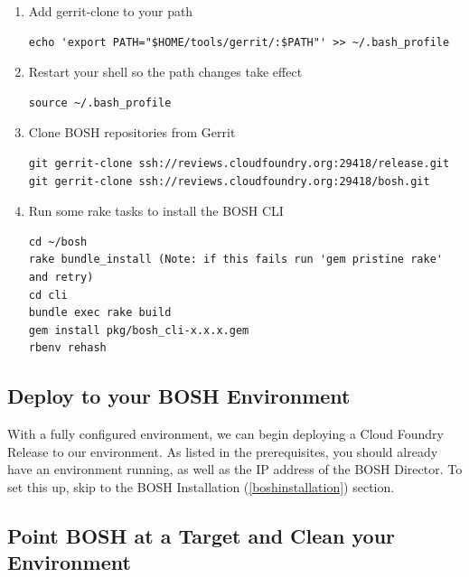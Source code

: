 \begin{enumerate}
\item Add gerrit-clone to your path

\begin{verbatim}
echo 'export PATH="$HOME/tools/gerrit/:$PATH"' >> ~/.bash_profile
\end{verbatim}


\item Restart your shell so the path changes take effect

\begin{verbatim}
source ~/.bash_profile
\end{verbatim}


\item Clone BOSH repositories from Gerrit

\begin{verbatim}
git gerrit-clone ssh://reviews.cloudfoundry.org:29418/release.git
git gerrit-clone ssh://reviews.cloudfoundry.org:29418/bosh.git
\end{verbatim}


\item Run some rake tasks to install the BOSH CLI

\begin{verbatim}
cd ~/bosh
rake bundle_install (Note: if this fails run 'gem pristine rake' and retry)
cd cli
bundle exec rake build
gem install pkg/bosh_cli-x.x.x.gem
rbenv rehash
\end{verbatim}


\end{enumerate}

\subsection{Deploy to your BOSH Environment}
\label{deploytoyourboshenvironment}

With a fully configured environment, we can begin deploying a Cloud Foundry Release to our environment. As listed in the prerequisites, you should already have an environment running, as well as the IP address of the BOSH Director. To set this up, skip to the BOSH Installation (\autoref{boshinstallation}) section.

\subsection{Point BOSH at a Target and Clean your Environment}
\label{pointboshatatargetandcleanyourenvironment}

